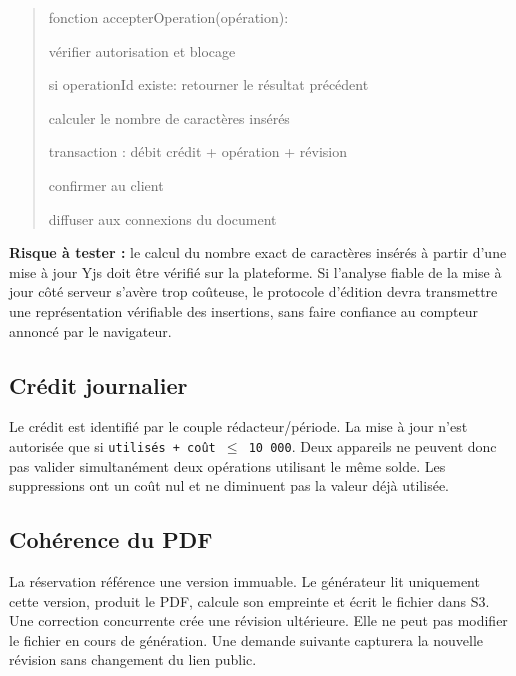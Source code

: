 \begin{quote}
\small\ttfamily\raggedright
fonction accepterOperation(opération):\par
\hspace*{1em}vérifier autorisation et blocage\par
\hspace*{1em}si operationId existe: retourner le résultat précédent\par
\hspace*{1em}calculer le nombre de caractères insérés\par
\hspace*{1em}transaction : débit crédit + opération + révision\par
\hspace*{1em}confirmer au client\par
\hspace*{1em}diffuser aux connexions du document
\end{quote}

\textbf{Risque à tester :} le calcul du nombre exact de caractères insérés à partir d'une mise à jour Yjs doit être vérifié sur la plateforme. Si l'analyse fiable de la mise à jour côté serveur s'avère trop coûteuse, le protocole d'édition devra transmettre une représentation vérifiable des insertions, sans faire confiance au compteur annoncé par le navigateur.


\subsection{Crédit journalier}

Le crédit est identifié par le couple rédacteur/période. La mise à jour n'est autorisée que si \texttt{utilisés + coût \ensuremath{\leq} 10 000}. Deux appareils ne peuvent donc pas valider simultanément deux opérations utilisant le même solde. Les suppressions ont un coût nul et ne diminuent pas la valeur déjà utilisée.


\subsection{Cohérence du PDF}

La réservation référence une version immuable. Le générateur lit uniquement cette version, produit le PDF, calcule son empreinte et écrit le fichier dans S3. Une correction concurrente crée une révision ultérieure. Elle ne peut pas modifier le fichier en cours de génération. Une demande suivante capturera la nouvelle révision sans changement du lien public.


